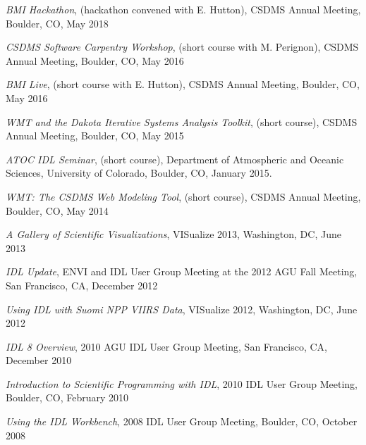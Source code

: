 \begin{enumerate}[{[}1{]}]
  \item \textit{BMI Hackathon}, (hackathon convened with E. Hutton),
    CSDMS Annual Meeting, Boulder, CO, May 2018

  \item \textit{CSDMS Software Carpentry Workshop}, (short course with
    M. Perignon), CSDMS Annual Meeting, Boulder, CO, May 2016

  \item \textit{BMI Live}, (short course with E. Hutton),
    CSDMS Annual Meeting, Boulder, CO, May 2016

  \item \textit{WMT and the Dakota Iterative Systems Analysis Toolkit},
    (short course), CSDMS Annual Meeting, Boulder, CO, May 2015

  \item \textit{ATOC IDL Seminar}, (short course), Department of
    Atmospheric and Oceanic Sciences, University of Colorado, Boulder,
    CO, January 2015.

  \item \textit{WMT: The CSDMS Web Modeling Tool}, (short course), CSDMS
    Annual Meeting, Boulder, CO, May 2014

  \item \textit{A Gallery of Scientific Visualizations}, {VISualize} 2013,
    Washington, DC, June 2013

  \item \textit{IDL Update}, ENVI and IDL User Group Meeting at the 2012
    AGU Fall Meeting, San Francisco, CA, December 2012

  \item \textit{Using IDL with Suomi NPP VIIRS Data}, {VISualize} 2012,
    Washington, DC, June 2012

  \item \textit{IDL 8 Overview}, 2010 AGU IDL User Group Meeting, San
    Francisco, CA, December 2010

  \item \textit{Introduction to Scientific Programming with IDL}, 2010 IDL
    User Group Meeting, Boulder, CO, February 2010

  \item \textit{Using the IDL Workbench}, 2008 IDL User Group Meeting,
    Boulder, CO, October 2008

\end{enumerate}
